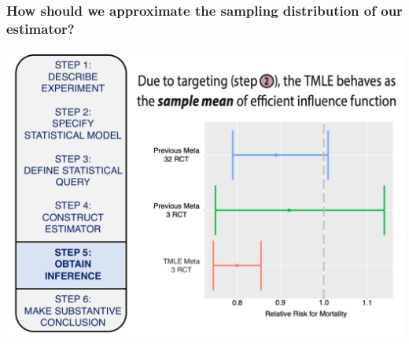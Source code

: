 \documentclass[t]{beamer}
\begin{document}
\begin{frame}
  \frametitle{How should we approximate the sampling distribution of our estimator?}
  \vspace{-20pt}
  \begin{center}
  \includegraphics[width = 1.05\textwidth]{figures/roadmap5.pdf}
  \end{center}
\end{frame}

\end{document}
